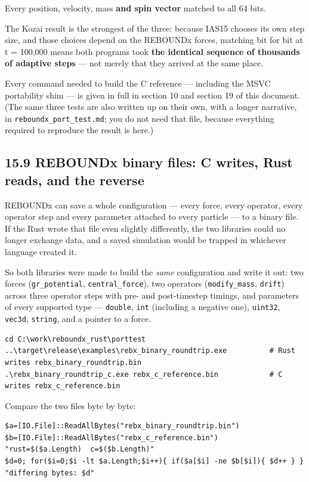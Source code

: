 \documentclass[11pt]{article}
\begin{document}
Every position, velocity, mass \textbf{and spin vector} matched to all 64 bits.

The Kozai result is the strongest of the three: because IAS15 chooses its own step size, and those choices depend on the REBOUNDx forces, matching bit for bit at t = 100,000 means both programs took \textbf{the identical sequence of thousands of adaptive steps} --- not merely that they arrived at the same place.

Every command needed to build the C reference --- including the MSVC portability shim --- is given in full in section 10 and section 19 of this document. (The same three tests are also written up on their own, with a longer narrative, in \texttt{reboundx\_port\_test.md}; you do not need that file, because everything required to reproduce the result is here.)

\subsection{15.9 REBOUNDx binary files: C writes, Rust reads, and the reverse}

REBOUNDx can save a whole configuration --- every force, every operator, every operator step and every parameter attached to every particle --- to a binary file. If the Rust wrote that file even slightly differently, the two libraries could no longer exchange data, and a saved simulation would be trapped in whichever language created it.

So both libraries were made to build the \emph{same} configuration and write it out: two forces (\texttt{gr\_potential}, \texttt{central\_force}), two operators (\texttt{modify\_mass}, \texttt{drift}) across three operator steps with pre- and post-timestep timings, and parameters of every supported type --- \texttt{double}, \texttt{int} (including a negative one), \texttt{uint32}, \texttt{vec3d}, \texttt{string}, and a pointer to a force.

\begin{lstlisting}
cd C:\work\reboundx_rust\porttest
..\target\release\examples\rebx_binary_roundtrip.exe          # Rust writes rebx_binary_roundtrip.bin
.\rebx_binary_roundtrip_c.exe rebx_c_reference.bin            # C writes rebx_c_reference.bin
\end{lstlisting}

Compare the two files byte by byte:

\begin{lstlisting}
$a=[IO.File]::ReadAllBytes("rebx_binary_roundtrip.bin")
$b=[IO.File]::ReadAllBytes("rebx_c_reference.bin")
"rust=$($a.Length)  c=$($b.Length)"
$d=0; for($i=0;$i -lt $a.Length;$i++){ if($a[$i] -ne $b[$i]){ $d++ } }
"differing bytes: $d"
\end{lstlisting}
\end{document}
